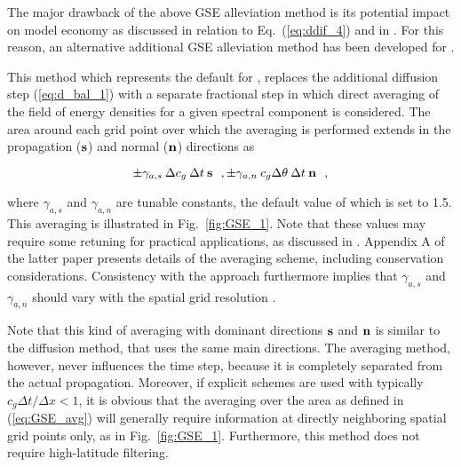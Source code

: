 
\vspace{\baselineskip} 
\vspace{\baselineskip} 



The major drawback of the above GSE alleviation method is its potential impact
on model economy as discussed in relation to Eq.~(\ref{eq:ddif_4}) and in
\cite{tol:Waves01a,tol:OMOD02b}. For this reason, an alternative additional GSE alleviation
method has been developed for \ws.

This method which represents the default for \ws, replaces the
additional diffusion step (\ref{eq:d_bal_1}) with a separate fractional step
in which direct averaging of the field of energy densities for a given
spectral component is considered. The area around each grid point over which
the averaging is performed extends in the propagation ($\mbox{\bf s}$) and normal
($\mbox{\bf n}$) directions as

\begin{equation}
\pm \gamma_{a,s} \: \Delta c_g \: \Delta t \: \bs \:\:\: ,
\pm \gamma_{a,n} \: c_g \Delta \theta \: \Delta t \: \bn \:\:\: , \label{eq:GSE_avg}
\end{equation}

\noindent
where $\gamma_{a,s}$ and $\gamma_{a,n}$ are tunable constants, the default
value of which is set to 1.5. This averaging is illustrated in
Fig.~\ref{fig:GSE_1}. Note that these values may require some retuning for
practical applications, as discussed in \cite{tol:OMOD02b}. Appendix A of the
latter paper presents details of the averaging scheme, including conservation
considerations. Consistency with the \cite{art:BH87} approach furthermore
implies that $\gamma_{a,s}$ and $\gamma_{a,n}$ should vary with the spatial
grid resolution \citep[see][Appendix]{tol:OMOD08a}.

Note that this kind of averaging with dominant directions $\mbox{\bf s}$ and $\mbox{\bf n}$ is
similar to the \cite{art:BH87} diffusion method, that uses the same main
directions. The averaging method, however, never influences the time step,
because it is completely separated from the actual propagation. Moreover, if
explicit schemes are used with typically $c_g \Delta t / \Delta x < 1$, it is
obvious that the averaging over the area as defined in (\ref{eq:GSE_avg}) will
generally require information at directly neighboring spatial grid points
only, as in Fig.~\ref{fig:GSE_1}. Furthermore, this method does not require
high-latitude filtering.

